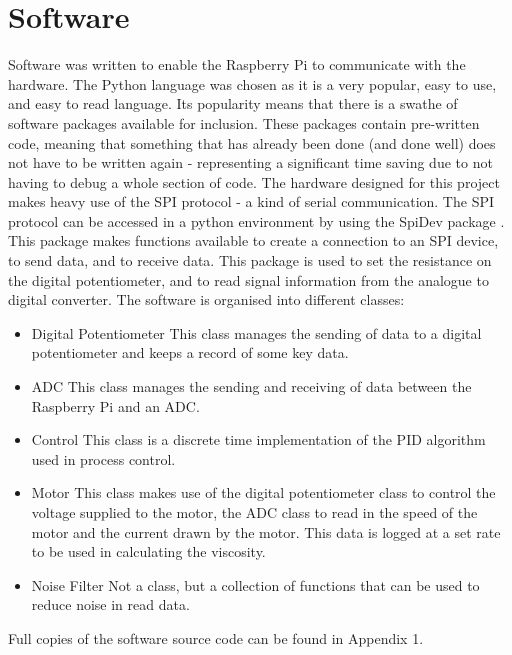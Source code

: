 \documentclass[twoside,a4]{report}
\def\br{\newline \newline \noindent}
\def\rpi{Raspberry Pi }
\begin{document}
	\section{Software} %
	Software was written to enable the \rpi to communicate with the hardware. The Python language was chosen as it is a very popular, easy to use, and easy to read language. Its popularity means that there is a swathe of software packages available for inclusion. These packages contain pre-written code, meaning that something that has already been done (and done well) does not have to be written again - representing a significant time saving due to not having to debug a whole section of code.\br
	The hardware designed for this project makes heavy use of the SPI protocol - a kind of serial communication. The SPI protocol can be accessed in a python environment by using the SpiDev package \cite{srcspidev}. This package makes functions available to create a connection to an SPI device, to send data, and to receive data. This package is used to set the resistance on the digital potentiometer, and to read signal information from the analogue to digital converter. \br
	The software is organised into different classes:
	\begin{itemize}
		\item Digital Potentiometer \newline 
		This class manages the sending of data to a digital potentiometer and keeps a record of some key data.
		\item ADC \newline 
		This class manages the sending and receiving of data between the \rpi and an ADC.
		\item Control\newline 
		This class is a discrete time implementation of the PID algorithm used in process control.
		\item Motor \newline
		This class makes use of the digital potentiometer class to control the voltage supplied to the motor, the ADC class to read in the speed of the motor and the current drawn by the motor. This data is logged at a set rate to be used in calculating the viscosity.
		\item Noise Filter \newline
		Not a class, but a collection of functions that can be used to reduce noise in read data.
	\end{itemize}
	Full copies of the software source code can be found in Appendix 1.
	
\end{document}
